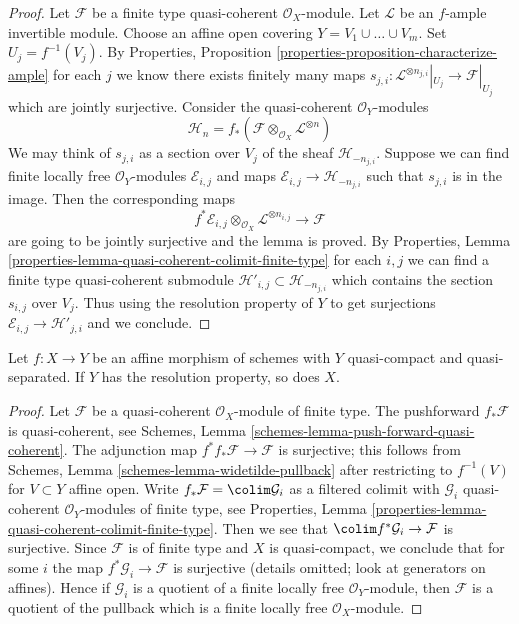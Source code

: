 \begin{proof}
Let $\mathcal{F}$ be a finite type quasi-coherent $\mathcal{O}_X$-module.
Let $\mathcal{L}$ be an $f$-ample invertible module.
Choose an affine open covering $Y = V_1 \cup \ldots \cup V_m$.
Set $U_j = f^{-1}(V_j)$. By Properties, Proposition
\ref{properties-proposition-characterize-ample}
for each $j$ we know there exists finitely many maps
$s_{j, i} : \mathcal{L}^{\otimes n_{j, i}}|_{U_j} \to \mathcal{F}|_{U_j}$
which are jointly surjective. Consider the quasi-coherent
$\mathcal{O}_Y$-modules
$$
\mathcal{H}_n =
f_*(\mathcal{F} \otimes_{\mathcal{O}_X} \mathcal{L}^{\otimes n})
$$
We may think of $s_{j, i}$ as a section over $V_j$ of the sheaf
$\mathcal{H}_{-n_{j, i}}$. Suppose we can find finite locally
free $\mathcal{O}_Y$-modules $\mathcal{E}_{i, j}$ and maps
$\mathcal{E}_{i, j} \to \mathcal{H}_{-n_{j, i}}$ such that
$s_{j, i}$ is in the image. Then the corresponding maps
$$
f^*\mathcal{E}_{i, j}
\otimes_{\mathcal{O}_X}
\mathcal{L}^{\otimes n_{i, j}} \longrightarrow \mathcal{F}
$$
are going to be jointly surjective and the lemma is proved. By
Properties, Lemma \ref{properties-lemma-quasi-coherent-colimit-finite-type}
for each $i, j$ we can find a finite
type quasi-coherent submodule
$\mathcal{H}'_{i, j} \subset  \mathcal{H}_{-n_{j, i}}$
which contains the section $s_{i, j}$ over $V_j$.
Thus using the resolution property of $Y$ to get surjections
$\mathcal{E}_{i, j} \to \mathcal{H}'_{j, i}$ and we conclude.
\end{proof}

\begin{lemma}
\label{lemma-resolution-property-goes-up-affine}
Let $f : X \to Y$ be an affine morphism of schemes with $Y$ quasi-compact
and quasi-separated. If $Y$ has the resolution property, so does $X$.
\end{lemma}

\begin{proof}
Let $\mathcal{F}$ be a quasi-coherent $\mathcal{O}_X$-module of finite type.
The pushforward $f_*\mathcal{F}$ is quasi-coherent, see
Schemes, Lemma \ref{schemes-lemma-push-forward-quasi-coherent}.
The adjunction map $f^*f_*\mathcal{F} \to \mathcal{F}$ is surjective;
this follows from Schemes, Lemma \ref{schemes-lemma-widetilde-pullback}
after restricting to $f^{-1}(V)$ for $V \subset Y$ affine open.
Write $f_*\mathcal{F} = \colim \mathcal{G}_i$ as a filtered colimit
with $\mathcal{G}_i$ quasi-coherent $\mathcal{O}_Y$-modules of finite type, see
Properties, Lemma \ref{properties-lemma-quasi-coherent-colimit-finite-type}.
Then we see that $\colim f^*\mathcal{G}_i \to \mathcal{F}$ is surjective.
Since $\mathcal{F}$ is of finite type and $X$ is quasi-compact,
we conclude that for some $i$ the map $f^*\mathcal{G}_i \to \mathcal{F}$
is surjective (details omitted; look at generators on affines).
Hence if $\mathcal{G}_i$ is a quotient of a finite locally free
$\mathcal{O}_Y$-module, then $\mathcal{F}$ is a quotient of the
pullback which is a finite locally free $\mathcal{O}_X$-module.
\end{proof}

